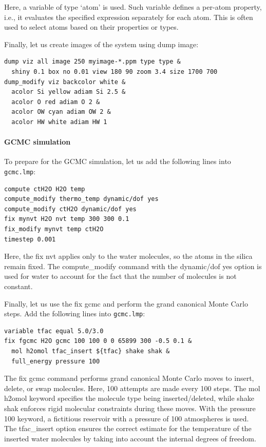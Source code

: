 \documentclass[9pt,tutorial]{livecoms}
\newcommand{\lmpcmd}[1]{\hspace{0pt}\colorbox{listing}{\textcolor{command}{\small{#1}}}\hspace{0pt}} %
\newcommand{\flecmd}[1]{\textcolor{command}{\texttt{#1}}} %
\begin{document}
\begin{note}
{\color{blue}Here, a variable of type `atom' is used.  Such variable 
defines a per-atom property, i.e., it evaluates the specified expression 
separately for each atom.  This is often used to select atoms based on 
their properties or types.}
\end{note}

Finally, let us create images
of the system using \lmpcmd{dump image}:
\begin{lstlisting}
dump viz all image 250 myimage-*.ppm type type &
  shiny 0.1 box no 0.01 view 180 90 zoom 3.4 size 1700 700
dump_modify viz backcolor white &
  acolor Si yellow adiam Si 2.5 &
  acolor O red adiam O 2 &
  acolor OW cyan adiam OW 2 &
  acolor HW white adiam HW 1
\end{lstlisting}

\paragraph{GCMC simulation}

To prepare for the GCMC simulation, let us add the
following lines into \flecmd{gcmc.lmp}:
\begin{lstlisting}
compute ctH2O H2O temp
compute_modify thermo_temp dynamic/dof yes
compute_modify ctH2O dynamic/dof yes
fix mynvt H2O nvt temp 300 300 0.1
fix_modify mynvt temp ctH2O
timestep 0.001
\end{lstlisting}
{\color{blue} Here, the \lmpcmd{fix nvt} applies only to the water molecules, so
the atoms in the silica remain fixed.  The \lmpcmd{compute\_modify} command with
the \lmpcmd{dynamic/dof yes} option is used for water to account for the fact
that the number of molecules is not constant.}

Finally, let us use the \lmpcmd{fix gcmc} and perform the grand canonical Monte
Carlo steps.  Add the following lines into \flecmd{gcmc.lmp}:
\begin{lstlisting}
variable tfac equal 5.0/3.0
fix fgcmc H2O gcmc 100 100 0 0 65899 300 -0.5 0.1 &
  mol h2omol tfac_insert ${tfac} shake shak &
  full_energy pressure 100
\end{lstlisting}
{\color{blue}The \lmpcmd{fix gcmc} command performs grand canonical Monte Carlo
moves to insert, delete, or swap molecules. Here, 100 attempts are made every
100 steps.  The \lmpcmd{mol h2omol} keyword specifies the
molecule type being inserted/deleted, while \lmpcmd{shake shak} enforces rigid
molecular constraints during these moves. With the \lmpcmd{pressure 100} keyword,
a fictitious reservoir with a pressure of 100 atmospheres is used.}
The \lmpcmd{tfac\_insert} option ensures the correct estimate for the temperature
of the inserted water molecules by taking into account the internal degrees of
freedom.
\end{document}
